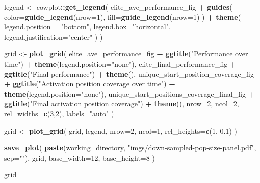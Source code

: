 \documentclass[]{book}
\newenvironment{Shaded}{\begin{snugshade}}{\end{snugshade}}
\newcommand{\DataTypeTok}[1]{\textcolor[rgb]{0.13,0.29,0.53}{#1}}
\newcommand{\DecValTok}[1]{\textcolor[rgb]{0.00,0.00,0.81}{#1}}
\newcommand{\FloatTok}[1]{\textcolor[rgb]{0.00,0.00,0.81}{#1}}
\newcommand{\KeywordTok}[1]{\textcolor[rgb]{0.13,0.29,0.53}{\textbf{#1}}}
\newcommand{\NormalTok}[1]{#1}
\newcommand{\OperatorTok}[1]{\textcolor[rgb]{0.81,0.36,0.00}{\textbf{#1}}}
\newcommand{\StringTok}[1]{\textcolor[rgb]{0.31,0.60,0.02}{#1}}
\begin{document}
\begin{Shaded}
\begin{Highlighting}[]
\NormalTok{legend <-}\StringTok{ }\NormalTok{cowplot}\OperatorTok{::}\KeywordTok{get_legend}\NormalTok{(}
\NormalTok{    elite_ave_performance_fig }\OperatorTok{+}
\StringTok{      }\KeywordTok{guides}\NormalTok{(}
        \DataTypeTok{color=}\KeywordTok{guide_legend}\NormalTok{(}\DataTypeTok{nrow=}\DecValTok{1}\NormalTok{),}
        \DataTypeTok{fill=}\KeywordTok{guide_legend}\NormalTok{(}\DataTypeTok{nrow=}\DecValTok{1}\NormalTok{)}
\NormalTok{      ) }\OperatorTok{+}
\StringTok{      }\KeywordTok{theme}\NormalTok{(}
        \DataTypeTok{legend.position =} \StringTok{"bottom"}\NormalTok{,}
        \DataTypeTok{legend.box=}\StringTok{"horizontal"}\NormalTok{,}
        \DataTypeTok{legend.justification=}\StringTok{"center"}
\NormalTok{      )}
\NormalTok{  )}

\NormalTok{grid <-}\StringTok{ }\KeywordTok{plot_grid}\NormalTok{(}
\NormalTok{  elite_ave_performance_fig }\OperatorTok{+}
\StringTok{    }\KeywordTok{ggtitle}\NormalTok{(}\StringTok{"Performance over time"}\NormalTok{) }\OperatorTok{+}
\StringTok{    }\KeywordTok{theme}\NormalTok{(}\DataTypeTok{legend.position=}\StringTok{"none"}\NormalTok{),}
\NormalTok{  elite_final_performance_fig }\OperatorTok{+}
\StringTok{    }\KeywordTok{ggtitle}\NormalTok{(}\StringTok{"Final performance"}\NormalTok{) }\OperatorTok{+}
\StringTok{    }\KeywordTok{theme}\NormalTok{(),}
\NormalTok{  unique_start_position_coverage_fig }\OperatorTok{+}
\StringTok{    }\KeywordTok{ggtitle}\NormalTok{(}\StringTok{"Activation position coverage over time"}\NormalTok{) }\OperatorTok{+}
\StringTok{    }\KeywordTok{theme}\NormalTok{(}\DataTypeTok{legend.position=}\StringTok{"none"}\NormalTok{),}
\NormalTok{  unique_start_positions_coverage_final_fig }\OperatorTok{+}
\StringTok{    }\KeywordTok{ggtitle}\NormalTok{(}\StringTok{"Final activation position coverage"}\NormalTok{) }\OperatorTok{+}
\StringTok{    }\KeywordTok{theme}\NormalTok{(),}
  \DataTypeTok{nrow=}\DecValTok{2}\NormalTok{,}
  \DataTypeTok{ncol=}\DecValTok{2}\NormalTok{,}
  \DataTypeTok{rel_widths=}\KeywordTok{c}\NormalTok{(}\DecValTok{3}\NormalTok{,}\DecValTok{2}\NormalTok{),}
  \DataTypeTok{labels=}\StringTok{"auto"}
\NormalTok{)}

\NormalTok{grid <-}\StringTok{ }\KeywordTok{plot_grid}\NormalTok{(}
\NormalTok{  grid,}
\NormalTok{  legend,}
  \DataTypeTok{nrow=}\DecValTok{2}\NormalTok{,}
  \DataTypeTok{ncol=}\DecValTok{1}\NormalTok{,}
  \DataTypeTok{rel_heights=}\KeywordTok{c}\NormalTok{(}\DecValTok{1}\NormalTok{, }\FloatTok{0.1}\NormalTok{)}
\NormalTok{)}

\KeywordTok{save_plot}\NormalTok{(}
  \KeywordTok{paste}\NormalTok{(working_directory, }\StringTok{"imgs/down-sampled-pop-size-panel.pdf"}\NormalTok{, }\DataTypeTok{sep=}\StringTok{""}\NormalTok{),}
\NormalTok{  grid,}
  \DataTypeTok{base_width=}\DecValTok{12}\NormalTok{,}
  \DataTypeTok{base_height=}\DecValTok{8}
\NormalTok{)}

\NormalTok{grid}
\end{Highlighting}
\end{Shaded}
\end{document}
